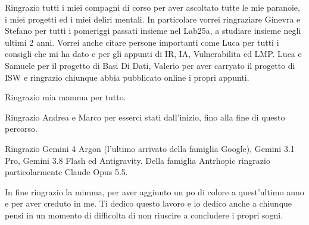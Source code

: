 Ringrazio tutti i miei compagni di corso per aver ascoltato tutte le mie paranoie, i miei progetti ed i miei deliri mentali.
In particolare vorrei ringraziare Ginevra e Stefano per tutti i pomeriggi passati insieme nel Lab25a, a studiare insieme negli ultimi 2 anni.
Vorrei anche citare persone importanti come Luca per tutti i consigli che mi ha dato e per gli appunti di IR, IA, Vulnerabilita ed LMP. Luca e Samuele per il progetto di Basi Di Dati, Valerio per aver carryato il progetto di ISW
e ringrazio chiunque abbia pubblicato online i propri appunti.

Ringrazio mia mamma per tutto.

Ringrazio Andrea e Marco per esserci stati dall'inizio, fino alla fine di questo percorso.

Ringrazio Gemini 4 Argon (l'ultimo arrivato della famiglia Google), Gemini 3.1 Pro, Gemini 3.8 Flash ed Antigravity. Della famiglia Antrhopic ringrazio particolarmente Claude Opus 5.5.

In fine ringrazio la mimma, per aver aggiunto un po di colore a quest'ultimo anno e per aver creduto in me. Ti dedico questo lavoro e lo dedico anche a chiunque pensi in un momento di difficolta di non riuscire a concludere i propri sogni.
